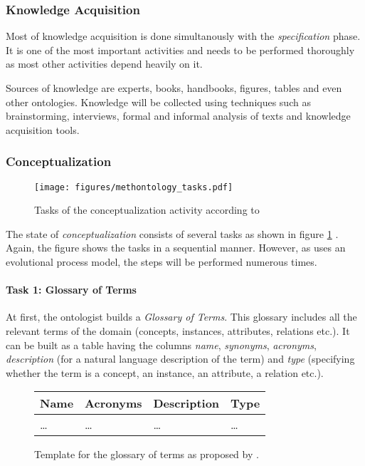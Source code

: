 \subsubsection{Knowledge Acquisition}

Most of knowledge acquisition is done simultanously with the \emph{specification} phase. It is one of the most important activities and needs to be performed thoroughly as most other activities depend heavily on it.

Sources of knowledge are experts, books, handbooks, figures, tables and even other ontologies. Knowledge will be collected using techniques such as brainstorming, interviews, formal and informal analysis of texts and knowledge acquisition tools.

\subsubsection{Conceptualization}

\begin{figure}
  \texttt{[image: figures/methontology\_tasks.pdf]}
  \caption{Tasks of the conceptualization activity according to \methontology \cite{MethontologyLegal}}
  \label{fig:methontology2}
\end{figure}

The state of \emph{conceptualization} consists of several tasks as shown in figure \ref{fig:methontology2} \cite{MethontologyLegal}. Again, the figure shows the tasks in a sequential manner. However, as \methontology uses an evolutional process model, the steps will be performed numerous times.

\paragraph{Task 1: Glossary of Terms}

At first, the ontologist builds a \emph{Glossary of Terms}. This glossary includes all the relevant terms of the domain (concepts, instances, attributes, relations etc.). It can be built as a table having the columns \emph{name}, \emph{synonyms}, \emph{acronyms}, \emph{description} (for a natural language description of the term) and \emph{type} (specifying whether the term is a concept, an instance, an attribute, a relation etc.).

\begin{figure}
\centering
\begin{tabular}{|p{}|p{}|p{}|p{}|}
  \hline
  \textbf{Name} & \textbf{Acronyms} & \textbf{Description} & \textbf{Type} \\
  \hline\hline
  … & … & … & … \\
  \hline
\end{tabular}
\caption{Template for the glossary of terms as proposed by \methontology.}
\label{fig:methontology_example_glossary}
\end{figure}

